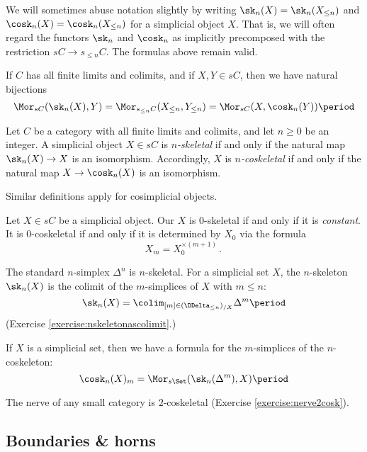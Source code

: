 We will sometimes abuse notation slightly by writing $\sk_n(X) = \sk_n(X_{\leq n})$ and $\cosk_n(X) = \cosk_n(X_{\leq n})$ for a simplicial object $X$.
That is, we will often regard the functors $\sk_n$ and $\cosk_n$ as implicitly precomposed with the restriction $sC \to s_{\leq n}C$.
The formulas above remain valid.

If $C$ has all finite limits and colimits, and if $X,Y \in sC$, then we have natural bijections
\[
  \Mor_{sC}(\sk_n(X), Y) = \Mor_{s_{\leq n}C}(X_{\leq n}, Y_{\leq n}) = \Mor_{sC}(X, \cosk_n(Y)) \period
\]

\begin{definition}
  Let $C$ be a category with all finite limits and colimits, and let $n \geq 0$ be an integer.
  A simplicial object $X \in sC$ is \emph{$n$-skeletal} if and only if the natural map $\sk_n(X) \to X$ is an isomorphism.
  Accordingly, $X$ is \emph{$n$-coskeletal} if and only if the natural map $X \to \cosk_n(X)$ is an isomorphism.

  Similar definitions apply for cosimplicial objects.
\end{definition}

\begin{eg}
  Let $X \in sC$ be a simplicial object.
  Our $X$ is $0$-skeletal if and only if it is \emph{constant}.
  It is $0$-coskeletal if and only if it is determined by $X_0$ via the formula
  \[
    X_m = X_0^{\times(m+1)} \period
  \]
\end{eg}

\begin{eg}
  The standard $n$-simplex $\Delta^n$ is $n$-skeletal.
  For a simplicial set $X$, the $n$-skeleton $\sk_n(X)$ is the colimit of the $m$-simplices of $X$ with $m \leq n$:
  \[
    \sk_n(X) = \colim_{[m] \in (\DDelta_{\leq n})_{/X}} \Delta^m \period
  \]
  (Exercise \ref{exercise:nskeletonascolimit}.)
\end{eg}

\begin{eg}
  If $X$ is a simplicial set, then we have a formula for the $m$-simplices of the $n$-coskeleton:
  \[
    \cosk_n(X)_m = \Mor_{s\Set}(\sk_n(\Delta^m), X) \period
  \]
\end{eg}

\begin{eg}
  The nerve of any small category is $2$-coskeletal (Exercise \ref{exercise:nerve2cosk}).
\end{eg}

\subsection{Boundaries \& horns}%
\label{sub:Boundariesandhorns}

